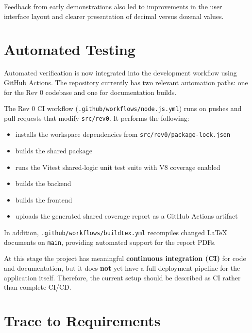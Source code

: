 \documentclass[12pt, titlepage]{article}
\begin{document}
    Feedback from early demonstrations also led to improvements in the user
    interface layout and clearer presentation of decimal versus dozenal values.


    \section{Automated Testing}

    Automated verification is now integrated into the development workflow using
    GitHub Actions. The repository currently has two relevant automation paths:
    one for the Rev 0 codebase and one for documentation builds.

    The Rev 0 CI workflow (\texttt{.github/workflows/node.js.yml}) runs on pushes
    and pull requests that modify \texttt{src/rev0}. It performs the following:

    \begin{itemize}
        \item installs the workspace dependencies from \texttt{src/rev0/package-lock.json}
        \item builds the shared package
        \item runs the Vitest shared-logic unit test suite with V8 coverage enabled
        \item builds the backend
        \item builds the frontend
        \item uploads the generated shared coverage report as a GitHub Actions artifact
    \end{itemize}

    In addition, \texttt{.github/workflows/buildtex.yml} recompiles changed LaTeX
    documents on \texttt{main}, providing automated support for the report PDFs.

    At this stage the project has meaningful \textbf{continuous integration (CI)}
    for code and documentation, but it does \textbf{not} yet have a full
    deployment pipeline for the application itself. Therefore, the current setup
    should be described as CI rather than complete CI/CD.

    \section{Trace to Requirements}

      \renewcommand{\arraystretch}{1.0}
\end{document}
